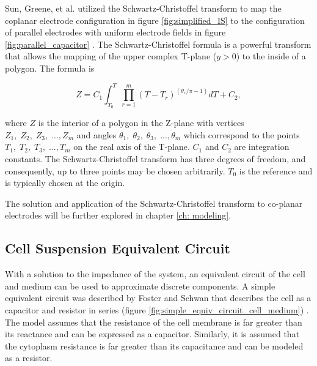  
    \par Sun, Greene, et al. utilized the Schwartz-Christoffel transform to map the coplanar electrode configuration in figure \ref{fig:simplified_IS} to the configuration of parallel electrodes with uniform electrode fields in figure \ref{fig:parallel_capacitor} \cite{sun_analytical_2007}. The Schwartz-Christoffel formula is a powerful transform that allows the mapping of the upper complex T-plane ($y>0$) to the inside of a polygon. The formula is
    
    \begin{equation}
        Z = C_1 \int_{T_0}^T \prod^m_{r=1} (T - T_r)^{(\theta_r/\pi - 1)} dT + C_2,
    \end{equation}
    
    \noindent where $Z$ is the interior of a polygon in the Z-plane with vertices $Z_1,\;Z_2,\;Z_3,\; ...,Z_m$ and angles $\theta_1,\;\theta_2,\;\theta_3,\; ...,\theta_m$ which correspond to the points $T_1,\;T_2,\;T_3,\; ...,T_m$ on the real axis of the T-plane. $C_1$ and $C_2$ are integration constants. The Schwartz-Christoffel transform has three degrees of freedom, and consequently, up to three points may be chosen arbitrarily. $T_0$ is the reference and is typically chosen at the origin.
    
    \par The solution and application of the Schwartz-Christoffel transform to co-planar electrodes will be further explored in chapter \ref{ch: modeling}.
    
    \FloatBarrier
    
    
 
    
 \subsection{Cell Suspension Equivalent Circuit}
 \label{sec: cell_suspension_equiv_circ}
 \par With a solution to the impedance of the system, an equivalent circuit of the cell and medium can be used to approximate discrete components. A simple equivalent circuit was described by Foster and Schwan that describes the cell as a capacitor and resistor in series (figure \ref{fig:simple_equiv_circuit_cell_medium}) \cite{schwan_electrical_1994}. The model assumes that the resistance of the cell membrane is far greater than its reactance and can be expressed as a capacitor. Similarly, it is assumed that the cytoplasm resistance is far greater than its capacitance and can be modeled as a resistor.
 
